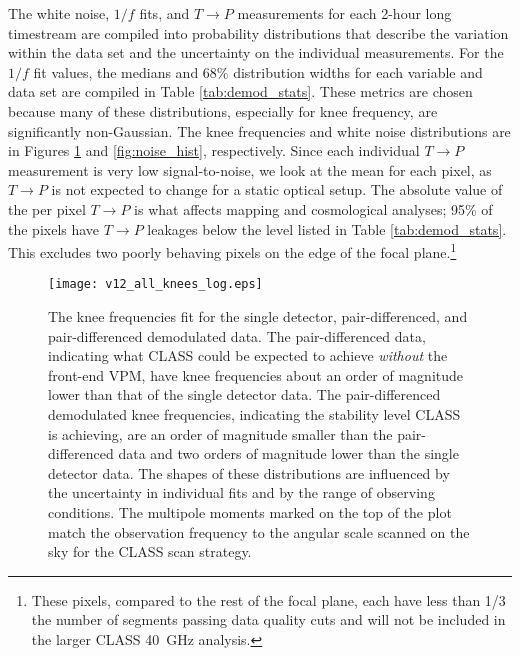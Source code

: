 \documentclass[twocolumn, tighten, numberedappendix, twocolappendix]{aastex63}
\begin{document}
The white noise, $1/f$ fits, and $T\rightarrow P$ measurements for each 2-hour long timestream are compiled into probability distributions that describe the variation within the data set and the uncertainty on the individual measurements. For the $1/f$ fit values, the medians and 68\% distribution widths for each variable and data set are compiled in Table \ref{tab:demod_stats}. These metrics are chosen because many of these distributions, especially for knee frequency, are significantly non-Gaussian. The knee frequencies and white noise distributions are in Figures \ref{fig:all_knees} and \ref{fig:noise_hist}, respectively. Since each individual $T\rightarrow P$ measurement is very low signal-to-noise, we look at the mean for each pixel, as $T\rightarrow P$ is not expected to change for a static optical setup. The absolute value of the per pixel $T\rightarrow P$ is what affects mapping and cosmological analyses; 95\% of the pixels have $T\rightarrow P$ leakages below the level listed in Table \ref{tab:demod_stats}. This excludes two poorly behaving pixels on the edge of the focal plane.\footnote{These pixels, compared to the rest of the focal plane, each have less than 1/3 the number of segments passing data quality cuts and will not be included in the larger CLASS 40~GHz analysis.}

\begin{figure}
    \centering
    \texttt{[image: v12\_all\_knees\_log.eps]}
    \caption{The knee frequencies fit for the single detector, pair-differenced, and pair-differenced demodulated data. The pair-differenced data, indicating what CLASS could be expected to achieve \textit{without} the front-end VPM, have knee frequencies about an order of magnitude lower than that of the single detector data. The pair-differenced demodulated knee frequencies, indicating the stability level CLASS is achieving, are an order of magnitude smaller than the pair-differenced data and two orders of magnitude lower than the single detector data. The shapes of these distributions are influenced by the uncertainty in individual fits and by the range of observing conditions. The multipole moments marked on the top of the plot match the observation frequency to the angular scale scanned on the sky for the CLASS scan strategy.}
    \label{fig:all_knees}
\end{figure}

\end{document}
